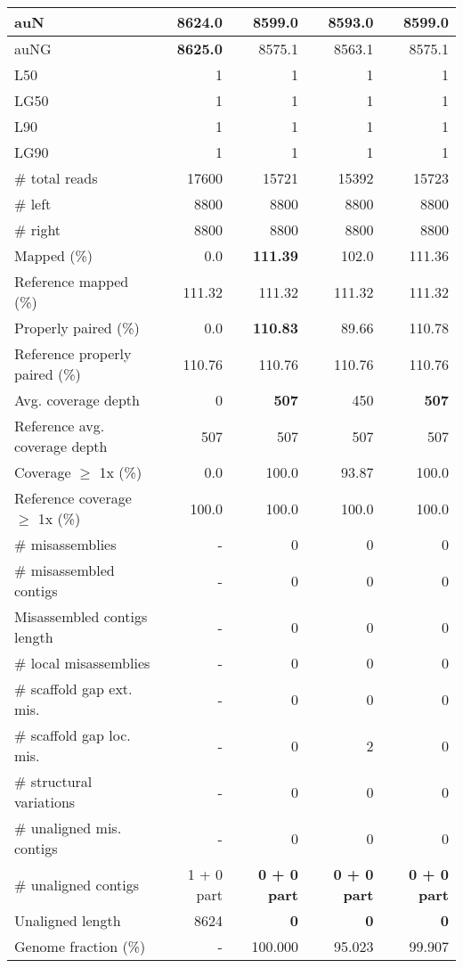 \documentclass[12pt,a4paper]{article}
\begin{document}
\begin{table}[ht]
\begin{center}
\begin{tabular}{|l*{4}{|r}|}
auN & {\bf 8624.0} & 8599.0 & 8593.0 & 8599.0 \\ \hline
auNG & {\bf 8625.0} & 8575.1 & 8563.1 & 8575.1 \\ \hline
L50 & 1 & 1 & 1 & 1 \\ \hline
LG50 & 1 & 1 & 1 & 1 \\ \hline
L90 & 1 & 1 & 1 & 1 \\ \hline
LG90 & 1 & 1 & 1 & 1 \\ \hline
\# total reads & 17600 & 15721 & 15392 & 15723 \\ \hline
\# left & 8800 & 8800 & 8800 & 8800 \\ \hline
\# right & 8800 & 8800 & 8800 & 8800 \\ \hline
Mapped (\%) & 0.0 & {\bf 111.39} & 102.0 & 111.36 \\ \hline
Reference mapped (\%) & 111.32 & 111.32 & 111.32 & 111.32 \\ \hline
Properly paired (\%) & 0.0 & {\bf 110.83} & 89.66 & 110.78 \\ \hline
Reference properly paired (\%) & 110.76 & 110.76 & 110.76 & 110.76 \\ \hline
Avg. coverage depth & 0 & {\bf 507} & 450 & {\bf 507} \\ \hline
Reference avg. coverage depth & 507 & 507 & 507 & 507 \\ \hline
Coverage $\geq$ 1x (\%) & 0.0 & 100.0 & 93.87 & 100.0 \\ \hline
Reference coverage $\geq$ 1x (\%) & 100.0 & 100.0 & 100.0 & 100.0 \\ \hline
\# misassemblies & - & 0 & 0 & 0 \\ \hline
\# misassembled contigs & - & 0 & 0 & 0 \\ \hline
Misassembled contigs length & - & 0 & 0 & 0 \\ \hline
\# local misassemblies & - & 0 & 0 & 0 \\ \hline
\# scaffold gap ext. mis. & - & 0 & 0 & 0 \\ \hline
\# scaffold gap loc. mis. & - & 0 & 2 & 0 \\ \hline
\# structural variations & - & 0 & 0 & 0 \\ \hline
\# unaligned mis. contigs & - & 0 & 0 & 0 \\ \hline
\# unaligned contigs & 1 + 0 part & {\bf 0 + 0 part} & {\bf 0 + 0 part} & {\bf 0 + 0 part} \\ \hline
Unaligned length & 8624 & {\bf 0} & {\bf 0} & {\bf 0} \\ \hline
Genome fraction (\%) & - & 100.000 & 95.023 & 99.907 \\ \hline

\end{tabular}
\end{center}
\end{table}
\end{document}
